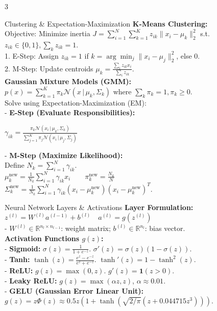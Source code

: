 \documentclass[10pt]{article}
\begin{document}
\begin{multicols*}{3}
\begin{mlBox}{Clustering \& Expectation-Maximization}
\textbf{K-Means Clustering:} \\
Objective: Minimize inertia $J = \sum_{i=1}^N \sum_{k=1}^K z_{ik} \|x_i - \mu_k\|_2^2$ s.t. $z_{ik} \in \{0, 1\}, \sum_k z_{ik} = 1$. \\
1. E-Step: Assign $z_{ik} = 1$ if $k = \arg\min_j \|x_i - \mu_j\|_2^2$, else $0$. \\
2. M-Step: Update centroids $\mu_k = \frac{\sum_i z_{ik} x_i}{\sum_i z_{ik}}$. \\
\textbf{Gaussian Mixture Models (GMM):} \\
$p(x) = \sum_{k=1}^K \pi_k \mathcal{N}(x \,|\, \mu_k, \Sigma_k)$ where $\sum_k \pi_k = 1, \pi_k \ge 0$. \\
Solve using Expectation-Maximization (EM): \\
- \textbf{E-Step (Evaluate Responsibilities):} \\
  {\centering $\gamma_{ik} = \frac{\pi_k \mathcal{N}(x_i \,|\, \mu_k, \Sigma_k)}{\sum_{j=1}^K \pi_j \mathcal{N}(x_i \,|\, \mu_j, \Sigma_j)}$\par}
- \textbf{M-Step (Maximize Likelihood):} \\
  Define $N_k = \sum_{i=1}^N \gamma_{ik}$. \\
  $\mu_k^{\text{new}} = \frac{1}{N_k} \sum_{i=1}^N \gamma_{ik} x_i \qquad \pi_k^{\text{new}} = \frac{N_k}{N}$ \\
  $\Sigma_k^{\text{new}} = \frac{1}{N_k} \sum_{i=1}^N \gamma_{ik} (x_i - \mu_k^{\text{new}})(x_i - \mu_k^{\text{new}})^T$.
\end{mlBox}

\begin{dlBox}{Neural Network Layers \& Activations}
\textbf{Layer Formulation:} \\
$z^{(l)} = W^{(l)} a^{(l-1)} + b^{(l)} \quad a^{(l)} = g\left(z^{(l)}\right)$ \\
- $W^{(l)} \in \mathbb{R}^{n_l \times n_{l-1}}$: weight matrix; $b^{(l)} \in \mathbb{R}^{n_l}$: bias vector. \\
\textbf{Activation Functions $g(z)$:} \\
- \textbf{Sigmoid:} $\sigma(z) = \frac{1}{1 + e^{-z}}$. $\sigma'(z) = \sigma(z)(1-\sigma(z))$. \\
- \textbf{Tanh:} $\tanh(z) = \frac{e^z - e^{-z}}{e^z + e^{-z}}$. $\tanh'(z) = 1 - \tanh^2(z)$. \\
- \textbf{ReLU:} $g(z) = \max(0, z)$. $g'(z) = \mathbf{1}(z > 0)$. \\
- \textbf{Leaky ReLU:} $g(z) = \max(\alpha z, z)$, $\alpha \approx 0.01$. \\
- \textbf{GELU (Gaussian Error Linear Unit):} \\
  $g(z) = z \Phi(z) \approx 0.5z \left(1 + \tanh\left(\sqrt{2/\pi}(z + 0.044715z^3)\right)\right)$.
\end{dlBox}


\end{multicols*}
\end{document}
